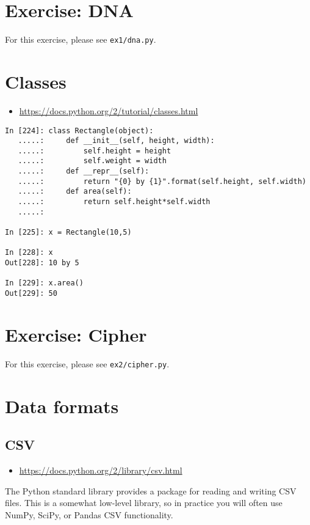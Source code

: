 \section{Exercise: DNA}

For this exercise, please see \texttt{ex1/dna.py}.

\section{Classes}
\begin{itemize}
\item \url{https://docs.python.org/2/tutorial/classes.html}
\end{itemize}

\begin{verbatim}
In [224]: class Rectangle(object):
   .....:     def __init__(self, height, width):
   .....:         self.height = height
   .....:         self.weight = width
   .....:     def __repr__(self):
   .....:         return "{0} by {1}".format(self.height, self.width)
   .....:     def area(self):
   .....:         return self.height*self.width
   .....:     

In [225]: x = Rectangle(10,5)

In [228]: x
Out[228]: 10 by 5

In [229]: x.area()
Out[229]: 50
\end{verbatim}

\section{Exercise: Cipher}

For this exercise, please see \texttt{ex2/cipher.py}.

\section{Data formats}

\subsection{CSV}
\begin{itemize}
\item \url{https://docs.python.org/2/library/csv.html}
\end{itemize}

The Python standard library provides a package for reading and writing CSV
files.  This is a somewhat low-level library, so in practice you will
often use NumPy, SciPy, or Pandas CSV functionality.

